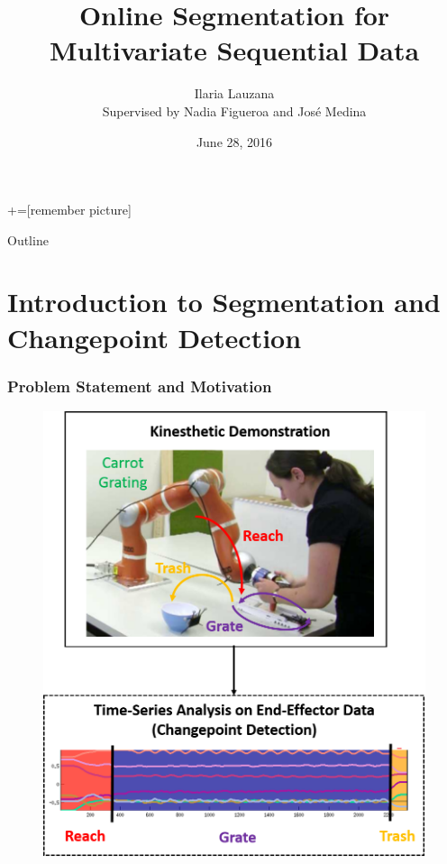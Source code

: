 \documentclass{beamer} %
\author[Ilaria Lauzana] {Ilaria Lauzana \newline \\ { \small Supervised by Nadia Figueroa and Jos\'e Medina} \newline {\small Prof. Aude Billard} \newline {\small Learning Algorithms and Systems Laboratory}}
\title[Online Segmentation for Multivariate Data]{Online Segmentation for Multivariate Sequential Data}
\date{June 28, 2016}
\begin{document}

+=[remember picture]

\everymath{\displaystyle}

\begin{frame}
  \titlepage
\end{frame}

\begin{frame}{Outline}
  \tableofcontents
\end{frame}

\section{Introduction to Segmentation and Changepoint Detection}

\begin{frame}
\frametitle{Problem Statement and Motivation}
\begin{figure}
\includegraphics[width=.5\textwidth]{changepoint.png}
\end{figure}
\end{frame}
\end{document}
